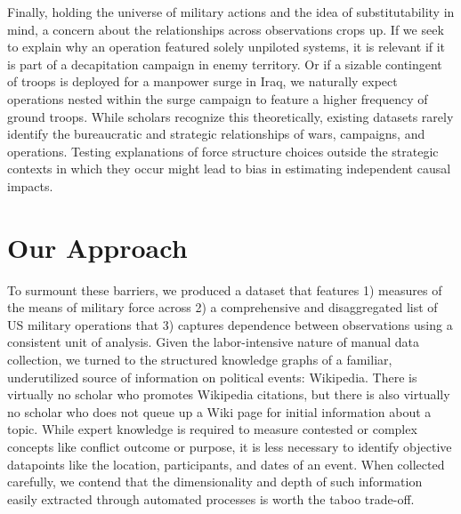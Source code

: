 \documentclass[fleqn,12pt]{article}
\begin{document}
Finally, holding the universe of military actions and the idea of substitutability in mind, a concern about the relationships across observations crops up. If we seek to explain why an operation featured solely unpiloted systems, it is relevant if it is part of a decapitation campaign in enemy territory. Or if a sizable contingent of troops is deployed for a manpower surge in Iraq, we naturally expect operations nested within the surge campaign to feature a higher frequency of ground troops. While scholars recognize this theoretically, existing datasets rarely identify the bureaucratic and strategic relationships of wars, campaigns, and operations. Testing explanations of force structure choices outside the strategic contexts in which they occur might lead to bias in estimating independent causal impacts.

\section*{Our Approach}
To surmount these barriers, we produced a dataset that features 1) measures of the means of military force across 2) a comprehensive and disaggregated list of US military operations that 3) captures dependence between observations using a consistent unit of analysis. Given the labor-intensive nature of manual data collection, we turned to the structured knowledge graphs of a familiar, underutilized source of information on political events: Wikipedia. There is virtually no scholar who promotes Wikipedia citations, but there is also virtually no scholar who does not queue up a Wiki page for initial information about a topic. While expert knowledge is required to measure contested or complex concepts like conflict outcome or purpose, it is less necessary to identify objective datapoints like the location, participants, and dates of an event. When collected carefully, we contend that the dimensionality and depth of such information easily extracted through automated processes is worth the taboo trade-off.
\end{document}
